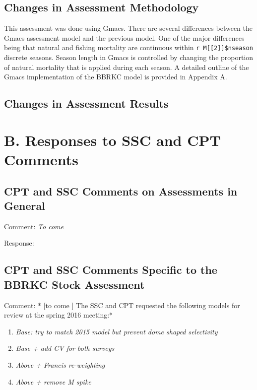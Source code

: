 \documentclass[]{article}
\providecommand{\tightlist}{%
  \setlength{\itemsep}{0pt}\setlength{\parskip}{0pt}}
\begin{document}
\subsection{Changes in Assessment
Methodology}\label{changes-in-assessment-methodology}

This assessment was done using Gmacs. There are several differences
between the Gmacs assessment model and the previous model. One of the
major differences being that natural and fishing mortality are
continuous within \texttt{r\ M{[}{[}2{]}{]}\$nseason} discrete seasons.
Season length in Gmacs is controlled by changing the proportion of
natural mortality that is applied during each season. A detailed outline
of the Gmacs implementation of the BBRKC model is provided in Appendix
A.

\subsection{Changes in Assessment
Results}\label{changes-in-assessment-results}

\section{B. Responses to SSC and CPT
Comments}\label{b.-responses-to-ssc-and-cpt-comments}

\subsection{CPT and SSC Comments on Assessments in
General}\label{cpt-and-ssc-comments-on-assessments-in-general}

Comment: \emph{To come}

Response:

\subsection{CPT and SSC Comments Specific to the BBRKC Stock
Assessment}\label{cpt-and-ssc-comments-specific-to-the-bbrkc-stock-assessment}

Comment: * {[}to come {]} The SSC and CPT requested the following models
for review at the spring 2016 meeting:*

\begin{enumerate}
\def\labelenumi{\arabic{enumi}.}
\tightlist
\item
  \emph{Base: try to match 2015 model but prevent dome shaped
  selectivity}
\item
  \emph{Base + add CV for both surveys}
\item
  \emph{Above + Francis re-weighting}
\item
  \emph{Above + remove M spike}
\end{enumerate}
\end{document}
